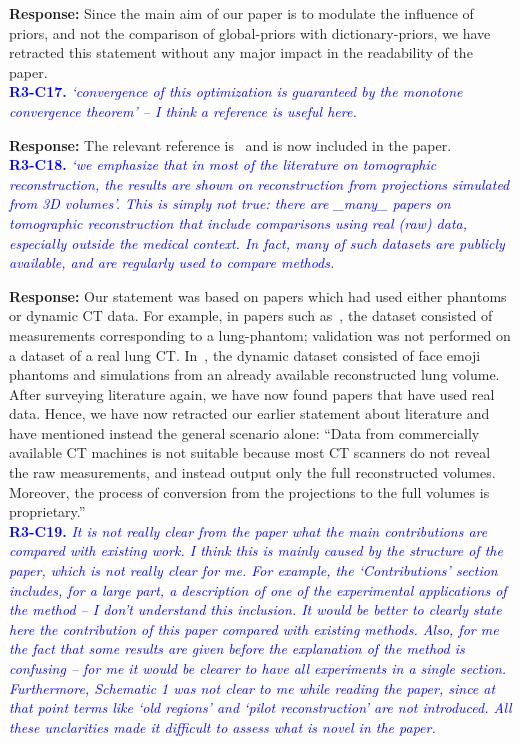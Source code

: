 \documentclass{article}
\begin{document}
\textbf{Response:} Since the main aim of our paper is to modulate the influence of priors, and not the comparison of global-priors with dictionary-priors, we have retracted this statement without any major impact in the readability of the paper. \\

\textcolor{blue}{\textbf{R3-C17.}\textit{ `convergence of this optimization is guaranteed by the monotone convergence theorem' -- I think a reference is useful here.}}

\textbf{Response:} The relevant reference is~\cite{monotone} and is now included in the paper.\\

\textcolor{blue}{\textbf{R3-C18.}\textit{ `we emphasize that in most of the literature on tomographic reconstruction, the results are shown on reconstruction from projections simulated from 3D volumes'. This is simply not true: there are \_many\_ papers on tomographic reconstruction that include comparisons using real (raw) data, especially outside the medical context. In fact, many of such datasets are publicly available, and are regularly used to compare methods.}}

\textbf{Response:} Our statement was based on papers which had used either phantoms or dynamic CT data. For example, in papers such as~\cite{pirple}, the dataset consisted of measurements corresponding to a lung-phantom; validation was not performed on a dataset of a real lung CT. In~\cite{Hakka2019}, the dynamic dataset consisted of face emoji phantoms and simulations from an already available reconstructed lung volume. After surveying literature again, we have now found papers that have used real data. Hence,  we have now retracted our earlier statement about literature and have mentioned instead the general scenario alone: ``Data from commercially available CT machines is not suitable because most CT scanners do not reveal the raw measurements, and instead output only the full reconstructed volumes. Moreover, the process of conversion from the  projections to the full volumes is proprietary.'' \\

\textcolor{blue}{\textbf{R3-C19.}\textit{ It is not really clear from the paper what the main contributions are compared with existing work. I think this is mainly caused by the structure of the paper, which is not really clear for me. For example, the `Contributions' section includes, for a large part, a description of one of the experimental applications of the method -- I don't understand this inclusion. It would be better to clearly state here the contribution of this paper compared with existing methods. Also, for me the fact that some results are given before the explanation of the method is confusing -- for me it would be clearer to have all experiments in a single section. Furthermore, Schematic 1 was not clear to me while reading the paper, since at that point terms like `old regions' and `pilot reconstruction' are not introduced. All these unclarities made it difficult to assess what is novel in the paper.}}
\end{document}
